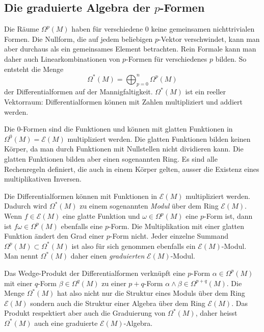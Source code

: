%
%
\subsection{Die graduierte Algebra der $p$-Formen}
Die Räume $\Omega^p(M)$ haben für verschiedene $0$ keine gemeinsamen 
nichttrivialen Formen.
Die Nullform, die auf jedem beliebigen $p$-Vektor verschwindet, kann man
aber durchaus als ein gemeinsames Element betrachten.
Rein Formale kann man daher auch Linearkombinationen von $p$-Formen für
verschiedenes $p$ bilden.
So entsteht die Menge
\[
\Omega^*(M)
=
\bigoplus_{p=0}^n \Omega^p (M)
\]
der Differentialformen auf der Mannigfaltigkeit.
$\Omega^*(M)$ ist ein reeller Vektorraum: Differentialformen können mit
Zahlen multipliziert und addiert werden.

Die $0$-Formen sind die Funktionen und können mit glatten Funktionen in
$\Omega^0(M)=\mathscr{E}(M)$ multipliziert werden.
Die glatten Funktionen bilden keinen Körper, da man durch Funktionen mit
Nullstellen nicht dividieren kann.
Die glatten Funktionen bilden aber einen sogenannten Ring. 
%
Es sind alle Rechenregeln definiert, die auch in einem Körper gelten,
ausser die Existenz eines multiplikativen Inversen.

Die Differentialformen können mit Funktionen in $\mathscr{E}(M)$
multipliziert werden.
Dadurch wird $\Omega^*(M)$ zu einem sogenannten {\em Modul} über
dem Ring $\mathscr{E}(M)$.
Wenn $f\in\mathscr{E}(M)$ eine glatte Funktion und $\omega\in\Omega^p(M)$
eine $p$-Form ist, dann ist $f\omega\in\Omega^p(M)$ ebenfalls eine
$p$-Form.
Die Multiplikation mit einer glatten Funktion ändert den Grad einer
$p$-Form nicht.
Jeder einzelne Summand $\Omega^p(M)\subset\Omega^*(M)$ ist also für
sich genommen ebenfalls ein $\mathscr{E}(M)$-Modul.
Man nennt $\Omega^*(M)$ daher einen {\em graduierten} $\mathscr{E}(M)$-Modul.
%
%

Das Wedge-Produkt der Differentialformen verknüpft eine $p$-Form
$\alpha\in\Omega^p(M)$ mit einer $q$-Form $\beta\in\Omega^q(M)$
zu einer $p+q$-Form $\alpha\wedge\beta\in\Omega^{p+q}(M)$.
Die Menge $\Omega^*(M)$ hat also nicht nur die Struktur eines
Moduls über dem Ring $\mathscr{E}(M)$ sondern auch die Struktur
einer Algebra über dem Ring $\mathscr{E}(M)$.
Das Produkt respektiert aber auch die Graduierung von $\Omega^*(M)$,
daher heisst $\Omega^*(M)$ auch eine graduierte $\mathscr{E}(M)$-Algebra.

%
%

